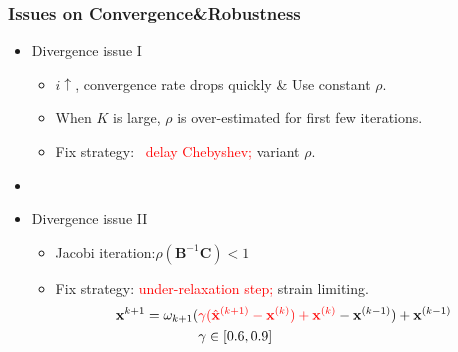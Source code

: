 \documentclass[serif,mathserif]{beamer}
\newcommand{\BOLD}[1]{\mathbf{#1}}
\newcommand{\TODO}[1]{\textcolor{red}{#1}}
\newcommand{\TODOG}[1]{\textcolor{green!50!black}{#1}}
\begin{document}
\begin{frame}
 \frametitle{Issues on Convergence\&Robustness}
 \begin{itemize}
  \item Divergence issue I
  \begin{itemize}
    \item $i \uparrow$, convergence rate drops quickly \& Use constant $\rho$.
    \item When $K$ is large, $\rho$ is over-estimated for first few iterations.
    \item Fix strategy: ~\TODO{delay Chebyshev;}  \TODOG{variant $\rho$.}
  \end{itemize}
  \item[]
  \item Divergence issue II
  \begin{itemize}
   \item Jacobi iteration:\quad $\rho(\BOLD{B}^{-1}\BOLD{C}) < 1$
   \item Fix strategy:  \TODO{under-relaxation step;}  \TODOG{strain limiting.} 
   \begin{equation*}
   \begin{split}
    \BOLD{x}^{k+1} = \omega_{k+1}(&\TODO{\gamma(\hat{\BOLD{x}}^{(k+1)}-\BOLD{x}^{(k)})+\BOLD{x}^{(k)}}-\BOLD{x}^{(k-1)})+\BOLD{x}^{(k-1)} \\
    &\gamma \in [0.6, 0.9]
   \end{split}
   \end{equation*}
  \end{itemize}
 \end{itemize}
\end{frame}
\end{document}
